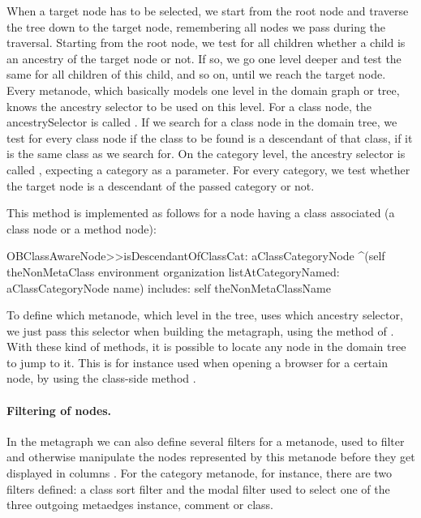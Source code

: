 \documentclass[a4paper,10pt,twoside]{book}
\begin{document}
When a target node has to be selected, we start from the root node and traverse the tree down to the target node, remembering all nodes we pass during the traversal. Starting from the root node, we test for all children whether a child is an ancestry of the target node or not. If so, we go one level deeper and test the same for all children of this child, and so on, until we reach the target node. Every metanode, which basically models one level in the domain graph or tree, knows the ancestry selector to be used on this level. For a class node, the ancestrySelector is called . If we search for a class node in the domain tree, we test for every class node if the class to be found is a descendant of that class, \ie if it is the same class as we search for. On the category level, the ancestry selector is called , expecting a category as a parameter. For every category, we test whether the target node is a descendant of the passed category or not. 

This method  is implemented as follows for a node having a class associated (\eg a class node or a method node):

\begin{code}{}
OBClassAwareNode>>isDescendantOfClassCat: aClassCategoryNode
    ^(self theNonMetaClass environment organization 
		listAtCategoryNamed: aClassCategoryNode name)
			includes: self theNonMetaClassName
\end{code}

To define which metanode, \ie which level in the tree, uses which ancestry selector, we just pass this selector when building the metagraph, using the method  of .
With these kind of methods, it is possible to locate any node in the domain tree to \eg jump to it. This is for instance used when opening a browser for a certain node, \eg by using the  class-side method .

\paragraph{Filtering of nodes.}

In the metagraph we can also define several filters for a metanode, used to filter and otherwise manipulate the nodes represented by this metanode before they get displayed in columns . For the category metanode, for instance, there are two filters defined: a class sort filter and the modal filter used to select one of the three outgoing metaedges instance, comment or class. 
\end{document}
